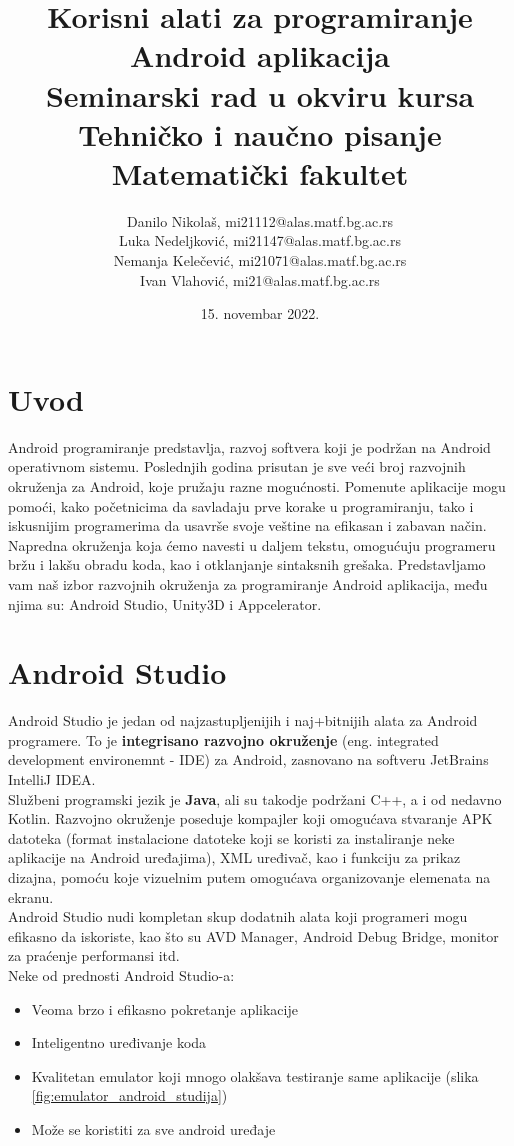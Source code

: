 \documentclass[12pt]{article}
\title{Korisni alati za programiranje Android aplikacija\\ \small{Seminarski rad u okviru kursa\\Tehničko i naučno pisanje\\ Matematički fakultet}}
\author{Danilo Nikolaš, mi21112@alas.matf.bg.ac.rs \\ Luka Nedeljković, mi21147@alas.matf.bg.ac.rs \\ Nemanja Kelečević, mi21071@alas.matf.bg.ac.rs \\ Ivan Vlahović, mi21@alas.matf.bg.ac.rs}
\date{15. novembar 2022.}
\begin{document}
\maketitle
{}
\tableofcontents
\pagebreak

\section{Uvod}
Android programiranje predstavlja, razvoj softvera koji je podržan na Android operativnom sistemu.
Poslednjih godina prisutan je sve veći broj razvojnih okruženja za Android, koje pružaju razne mogućnosti. Pomenute aplikacije mogu pomoći, 
kako početnicima da savladaju prve korake u programiranju, tako i iskusnijim programerima da usavrše svoje veštine na efikasan i zabavan način.
Napredna okruženja koja ćemo navesti u daljem tekstu, omogućuju programeru bržu i lakšu obradu koda, kao i otklanjanje sintaksnih grešaka. 
Predstavljamo vam naš izbor razvojnih okruženja za programiranje Android aplikacija, među njima su: Android Studio, Unity3D i Appcelerator. \

\section{Android Studio}
Android Studio je jedan od najzastupljenijih i naj+bitnijih alata za Android programere. To je \textbf{integrisano razvojno okruženje} (eng. integrated development environemnt - IDE) za Android, zasnovano na softveru JetBrains IntelliJ IDEA.  \\
\hspace*{0.7cm}Službeni programski jezik je \textbf{Java}, ali su takodje podržani C++, a i od nedavno Kotlin. Razvojno okruženje poseduje kompajler koji omogućava stvaranje APK datoteka (format instalacione datoteke koji se koristi za instaliranje neke aplikacije na Android uređajima), XML uređivač, kao i funkciju za prikaz dizajna, pomoću koje vizuelnim putem omogućava organizovanje elemenata na ekranu.\cite{Android Studio} \\
\hspace*{0.7cm}Android Studio nudi kompletan skup dodatnih alata koji programeri mogu efikasno da iskoriste, kao što su AVD Manager, Android Debug Bridge, monitor za praćenje performansi itd.\\
\hspace*{0.7cm}Neke od prednosti Android Studio-a:
\begin{itemize}
\item{Veoma brzo i efikasno pokretanje aplikacije}
\item{Inteligentno uređivanje koda} 
\item{Kvalitetan emulator koji mnogo olakšava testiranje same aplikacije (slika \ref{fig:emulator_android_studija})}
\item{Može se koristiti za sve android uređaje}
\end{itemize}
\end{document}

